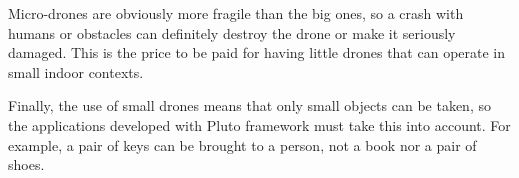 Micro-drones are obviously more fragile than the big ones, so a crash with humans or obstacles can definitely destroy the drone or make it seriously damaged. This is the price to be paid for having little drones that can operate in small indoor contexts.

Finally, the use of small drones means that only small objects can be taken, so the applications developed with Pluto framework must take this into account.
For example, a pair of keys can be brought to a person, not a book nor a pair of shoes.
